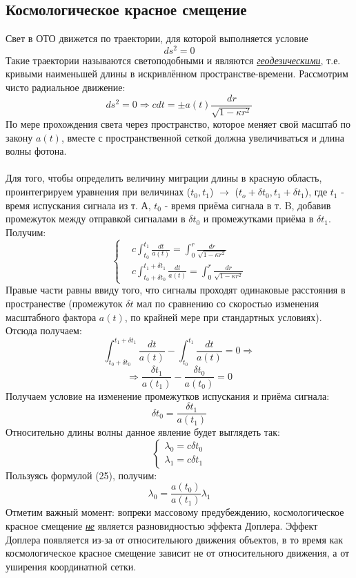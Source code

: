 \documentclass{article}
\newcommand{\ttt}[1]{\underline{\textit{#1}}}
\newcommand{\eq}[1]{\begin{equation} #1 \end{equation}}
\begin{document}
\subsection*{Космологическое красное смещение}
Свет в ОТО движется по траектории, для которой выполняется условие \eq{ds^2 = 0} Такие
траектории называются светоподобными и являются \ttt{геодезическими}, т.е. кривыми наименьшей
длины в искривлённом пространстве-времени. Рассмотрим чисто радиальное движение:
\eq{ds^2 = 0 \Rightarrow cdt=\pm a(t) \frac{dr}{\sqrt{1-\kappa r^2}} }
По мере прохождения света через пространство, которое меняет свой масштаб по закону
$a(t)$, вместе с пространственной сеткой должна увеличиваться и длина волны фотона.\\\\ 
Для того, чтобы определить величину миграции длины в красную область, проинтегрируем 
уравнения при величинах ($t_0, t_1$) $\to$ ($t_o+\delta t_0, t_1 + \delta t_1$), где 
$t_1$ - время испускания сигнала из т. А, $t_0$ - время приёма сигнала в т. B, добавив
промежуток между отправкой сигналами в $\delta t_0$ и промежутками приёма в $\delta t_1$.\\  Получим:
\begin{equation} 
\left\{  \begin{aligned} 
  & c \int_{t_0}^{t_1} \frac{dt}{a(t)}=\int_{0}^{r} \frac{dr}{\sqrt{1-\kappa r^2}} \\
  & c \int_{t_0+\delta t_0}^{t_1+\delta t_1} \frac{dt}{a(t)}=\int_{0}^{r} \frac{dr}{\sqrt{1-\kappa r^2}}
      \end{aligned} \right.
  \end{equation}
Правые части равны ввиду того, что сигналы проходят одинаковые расстояния в пространестве (промежуток $\delta t$ 
мал по сравнению со скоростью изменения масштабного фактора $a(t)$, по крайней
мере при стандартных условиях). Отсюда получаем:
\eq{\int_{t_0+\delta t_0}^{t_1+\delta t_1} \frac{dt}{a(t)} - \int_{t_0}^{t_1} \frac{dt}{a(t)} = 0 \Rightarrow} 
\eq{\Rightarrow \frac{\delta t_1}{a(t_1)}-\frac{\delta t_0}{a(t_0)}=0}
Получаем условие на изменение промежутков испускания и приёма сигнала:
\eq{\delta t_0 = \frac{\delta t_1}{a(t_1)}}
Относительно длины волны данное явление будет выглядеть так:
\begin{equation} 
  \left\{  \begin{aligned} 
       \lambda_0 = c \delta t_0 \\
       \lambda_1 = c \delta t_1
        \end{aligned} \right.
    \end{equation}
Пользуясь формулой (25), получим:
\eq{\boxed{\lambda_0  = \frac{a(t_0)}{a(t_1)}\lambda_1 }}
Отметим важный момент: вопреки массовому предубеждению, космологическое красное смещение
\ttt{не} является разновидностью эффекта Доплера. Эффект Доплера появляется из-за от относительного
движения объектов, в то время как космологическое красное смещение зависит не от
относительного движения, а от уширения координатной сетки.
\end{document}
